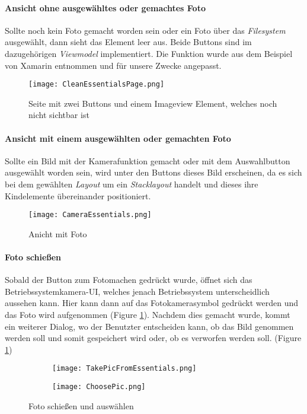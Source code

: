 \paragraph{Ansicht ohne ausgewähltes oder gemachtes Foto}
 Sollte noch kein Foto gemacht worden sein oder ein Foto über das \textit{Filesystem}
 ausgewählt, dann sieht das Element leer aus. Beide Buttons sind im dazugehörigen \textit{Viewmodel} implementiert.
 Die Funktion wurde aus dem Beispiel von Xamarin entnommen und für unsere Zwecke angepasst.
\begin{figure}[hbt!]
    \centering
    \texttt{[image: CleanEssentialsPage.png]}
    \caption{Seite mit zwei Buttons und einem Imageview Element, welches noch nicht sichtbar ist}
\end{figure}
\newpage
\paragraph{Ansicht mit einem ausgewählten oder gemachten Foto}
 Sollte ein Bild mit der Kamerafunktion gemacht oder mit dem Auswahlbutton ausgewählt worden sein,
 wird unter den Buttons dieses Bild erscheinen, da es sich bei dem gewählten \textit{Layout} um ein \textit{Stacklayout}
 handelt und dieses ihre Kindelemente übereinander positioniert.
\begin{figure}[hbt!]
    \centering
    \texttt{[image: CameraEssentials.png]}
    \caption{Anicht mit Foto}
\end{figure}

\paragraph{Foto schießen}
 Sobald der Button zum Fotomachen gedrückt wurde, öffnet sich das Betriebssystemkamera-UI, welches jenach Betriebssystem unterscheidlich aussehen kann. Hier kann dann auf das Fotokamerasymbol
 gedrückt werden und das Foto wird aufgenommen (Figure \ref{fig:TakeFoto}). 
 Nachdem dies gemacht wurde, kommt ein weiterer Dialog, wo der Benutzter entscheiden kann, ob das Bild genommen werden soll und somit gespeichert wird oder, ob es verworfen werden soll. (Figure \ref{fig:TakeFoto})
 
\begin{figure}[hbt!]
    \centering
    \begin{subfigure}[b]{0.4\linewidth}
        \texttt{[image: TakePicFromEssentials.png]}
      \end{subfigure}
      \begin{subfigure}[b]{0.4\linewidth}
        \texttt{[image: ChoosePic.png]}
      \end{subfigure}
    \caption{Foto schießen und auswählen}
    \label{fig:TakeFoto}
\end{figure}

